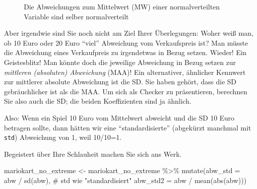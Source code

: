\documentclass[
  a4paper,
]{scrbook}
\newenvironment{Shaded}{\begin{snugshade}}{\end{snugshade}}
\newcommand{\AttributeTok}[1]{\textcolor[rgb]{0.40,0.45,0.13}{#1}}
\newcommand{\CommentTok}[1]{\textcolor[rgb]{0.37,0.37,0.37}{#1}}
\newcommand{\FunctionTok}[1]{\textcolor[rgb]{0.28,0.35,0.67}{#1}}
\newcommand{\NormalTok}[1]{\textcolor[rgb]{0.00,0.23,0.31}{#1}}
\newcommand{\OtherTok}[1]{\textcolor[rgb]{0.00,0.23,0.31}{#1}}
\newcommand{\SpecialCharTok}[1]{\textcolor[rgb]{0.37,0.37,0.37}{#1}}
\theoremstyle{definition}
\theoremstyle{definition}
\theoremstyle{definition}
\theoremstyle{remark}
\begin{document}
\begin{figure}


\caption{\label{fig-norm-dev}Die Abweichungen zum Mittelwert (MW) einer
normalverteilten Variable sind selber normalverteilt}

\end{figure}%

Aber irgendwie sind Sie noch nicht am Ziel Ihrer Überlegungen: Woher
weiß man, ob 10 Euro oder 20 Euro ``viel'' Abweichung vom Verkaufspreis
ist? Man müsste die Abweichung eines Verkaufpreis zu irgendetwas in
Bezug setzen. Wieder! Ein Geistesblitz! Man könnte doch die jeweilige
Abweichung in Bezug setzen zur \emph{mittleren (absoluten) Abweichung}
(MAA)! Ein alternativer, ähnlicher Kennwert zur mittlerer absolute
Abweichung ist die SD. Sie haben gehört, dass die SD gebräuchlicher ist
als die MAA. Um sich als Checker zu präsentieren, berechnen Sie also
auch die SD; die beiden Koeffizienten sind ja ähnlich.

Also: Wenn ein Spiel 10 Euro vom Mittelwert abweicht und die SD 10 Euro
betragen sollte, dann hätten wir eine ``standardisierte'' (abgekürzt
manchmal mit \texttt{std}) Abweichung von 1, weil 10/10=1.

Begeistert über Ihre Schlauheit machen Sie sich ans Werk.

\begin{Shaded}
\begin{Highlighting}[]
\NormalTok{mariokart\_no\_extreme }\OtherTok{\textless{}{-}}
\NormalTok{  mariokart\_no\_extreme }\SpecialCharTok{\%\textgreater{}\%} 
  \FunctionTok{mutate}\NormalTok{(}\AttributeTok{abw\_std =}\NormalTok{ abw }\SpecialCharTok{/} \FunctionTok{sd}\NormalTok{(abw),  }\CommentTok{\# std wie "standardisiert"}
         \AttributeTok{abw\_std2 =}\NormalTok{ abw }\SpecialCharTok{/} \FunctionTok{mean}\NormalTok{(}\FunctionTok{abs}\NormalTok{(abw)))  }
\end{Highlighting}
\end{Shaded}
\end{document}
